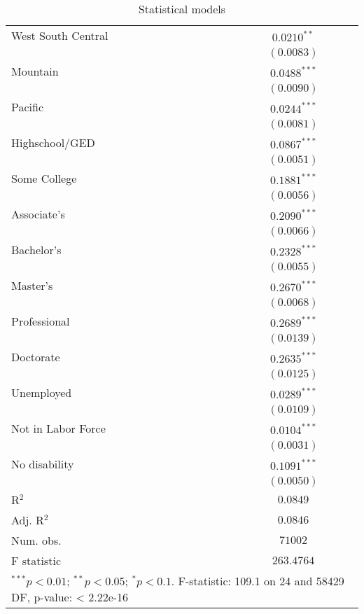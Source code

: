 \begin{table}
\begin{center}
\begin{tabular}{l c}
West South Central             & $0.0210^{**}$   \\
                               & $(0.0083)$      \\
Mountain                       & $0.0488^{***}$  \\
                               & $(0.0090)$      \\
Pacific                        & $0.0244^{***}$  \\
                               & $(0.0081)$      \\
Highschool/GED                 & $0.0867^{***}$  \\
                               & $(0.0051)$      \\
Some College                   & $0.1881^{***}$  \\
                               & $(0.0056)$      \\
Associate's                    & $0.2090^{***}$  \\
                               & $(0.0066)$      \\
Bachelor's                     & $0.2328^{***}$  \\
                               & $(0.0055)$      \\
Master's                       & $0.2670^{***}$  \\
                               & $(0.0068)$      \\
Professional                   & $0.2689^{***}$  \\
                               & $(0.0139)$      \\
Doctorate                      & $0.2635^{***}$  \\
                               & $(0.0125)$      \\
Unemployed                     & $0.0289^{***}$  \\
                               & $(0.0109)$      \\
Not in Labor Force             & $0.0104^{***}$  \\
                               & $(0.0031)$      \\
No disability                  & $0.1091^{***}$  \\
                               & $(0.0050)$      \\
\hline
R$^2$                          & $0.0849$        \\
Adj. R$^2$                     & $0.0846$        \\
Num. obs.                      & $71002$         \\
F statistic                    & $263.4764$      \\
\hline
\multicolumn{2}{l}{\scriptsize{$^{***}p<0.01$; $^{**}p<0.05$; $^{*}p<0.1$. 
F-statistic: 109.1 on 24 and 58429 DF, p-value: < 2.22e-16}}
\end{tabular}
\caption{Statistical models}
\label{table:coefficients}
\end{center}
\end{table}
